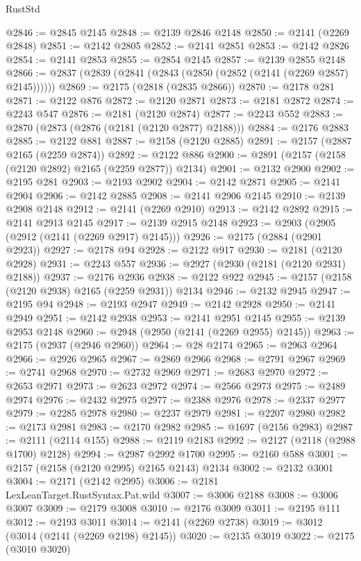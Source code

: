 \begin{lexlean}{RustStd}
\begin{coremodule}
@2846 := @2845 @2145
@2848 := @2139 @2846 @2148
@2850 := @2141 (@2269 @2848)
@2851 := @2142 @2805
@2852 := @2141 @2851
@2853 := @2142 @2826
@2854 := @2141 @2853
@2855 := @2854 @2145
@2857 := @2139 @2855 @2148
@2866 := @2837 (@2839 (@2841 (@2843 (@2850 (@2852 (@2141 (@2269 @2857) @2145))))))
@2869 := @2175 (@2818 (@2835 @2866))
@2870 := @2178 @281
@2871 := @2122 @876
@2872 := @2120 @2871
@2873 := @2181 @2872
@2874 := @2243 @547
@2876 := @2181 (@2120 @2874)
@2877 := @2243 @552
@2883 := @2870 (@2873 (@2876 (@2181 (@2120 @2877) @2188)))
@2884 := @2176 @2883
@2885 := @2122 @881
@2887 := @2158 (@2120 @2885)
@2891 := @2157 (@2887 @2165 (@2259 @2874))
@2892 := @2122 @886
@2900 := @2891 (@2157 (@2158 (@2120 @2892) @2165 (@2259 @2877)) @2134)
@2901 := @2132 @2900
@2902 := @2195 @281
@2903 := @2193 @2902
@2904 := @2142 @2871
@2905 := @2141 @2904
@2906 := @2142 @2885
@2908 := @2141 @2906 @2145
@2910 := @2139 @2908 @2148
@2912 := @2141 (@2269 @2910)
@2913 := @2142 @2892
@2915 := @2141 @2913 @2145
@2917 := @2139 @2915 @2148
@2923 := @2903 (@2905 (@2912 (@2141 (@2269 @2917) @2145)))
@2926 := @2175 (@2884 (@2901 @2923))
@2927 := @2178 @94
@2928 := @2122 @917
@2930 := @2181 (@2120 @2928)
@2931 := @2243 @557
@2936 := @2927 (@2930 (@2181 (@2120 @2931) @2188))
@2937 := @2176 @2936
@2938 := @2122 @922
@2945 := @2157 (@2158 (@2120 @2938) @2165 (@2259 @2931)) @2134
@2946 := @2132 @2945
@2947 := @2195 @94
@2948 := @2193 @2947
@2949 := @2142 @2928
@2950 := @2141 @2949
@2951 := @2142 @2938
@2953 := @2141 @2951 @2145
@2955 := @2139 @2953 @2148
@2960 := @2948 (@2950 (@2141 (@2269 @2955) @2145))
@2963 := @2175 (@2937 (@2946 @2960))
@2964 := @28 @2174
@2965 := @2963 @2964
@2966 := @2926 @2965
@2967 := @2869 @2966
@2968 := @2791 @2967
@2969 := @2741 @2968
@2970 := @2732 @2969
@2971 := @2683 @2970
@2972 := @2653 @2971
@2973 := @2623 @2972
@2974 := @2566 @2973
@2975 := @2489 @2974
@2976 := @2432 @2975
@2977 := @2388 @2976
@2978 := @2337 @2977
@2979 := @2285 @2978
@2980 := @2237 @2979
@2981 := @2207 @2980
@2982 := @2173 @2981
@2983 := @2170 @2982
@2985 := @1697 (@2156 @2983)
@2987 := @2111 (@2114 @155)
@2988 := @2119 @2183
@2992 := @2127 (@2118 (@2988 @1700) @2128)
@2994 := @2987 @2992 @1700
@2995 := @2160 @588
@3001 := @2157 (@2158 (@2120 @2995) @2165 @2143) @2134
@3002 := @2132 @3001
@3004 := @2171 (@2142 @2995)
@3006 := @2181 LexLeanTarget.RustSyntax.Pat.wild
@3007 := @3006 @2188
@3008 := @3006 @3007
@3009 := @2179 @3008
@3010 := @2176 @3009
@3011 := @2195 @111
@3012 := @2193 @3011
@3014 := @2141 (@2269 @2738)
@3019 := @3012 (@3014 (@2141 (@2269 @2198) @2145))
@3020 := @2135 @3019
@3022 := @2175 (@3010 @3020)

\end{coremodule}
\end{lexlean}
